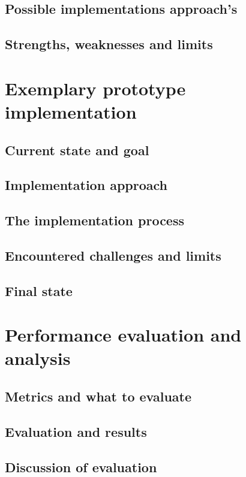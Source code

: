 \documentclass[12pt, a4paper]{article}
\begin{document}
    \subsection{Possible implementations approach's}
    \subsection{Strengths, weaknesses and limits}

\section{Exemplary prototype implementation}\label{sec::solution_code}
    \subsection{Current state and goal}
    \subsection{Implementation approach}
    \subsection{The implementation process}
    \subsection{Encountered challenges and limits}
    \subsection{Final state}

\section{Performance evaluation and analysis}\label{sec::eval}
    \subsection{Metrics and what to evaluate}
    \subsection{Evaluation and results}
    \subsection{Discussion of evaluation}
\end{document}
